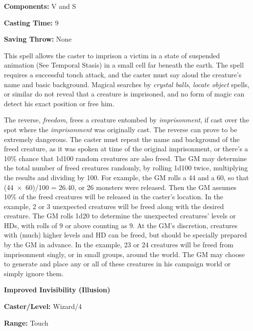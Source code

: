 \begin{multicols}{2}
\begin{minipage}{\columnwidth}
\noindent \textbf{Components:} V and S

\noindent \textbf{Casting Time:} 9

\noindent \textbf{Saving Throw:} None

\end{minipage}

This spell allows the caster to imprison a victim in a state of suspended animation (See Temporal Stasis) in a small cell far beneath the earth.  The spell requires a successful touch attack, and the caster must say aloud the creature's name and basic background.  Magical searches by \textit{crystal balls}, \textit{locate object} spells, or similar do not reveal that a creature is imprisoned, and no form of magic can detect his exact position or free him.

The reverse, \textit{freedom}, frees a creature entombed by \textit{imprisonment}, if cast over the spot where the \textit{imprisonment} was originally cast.  The reverse can prove to be extremely dangerous.  The caster must repeat the name and background of the freed creature, as it was spoken at time of the original imprisonment, or there's a 10\% chance that 1d100 random creatures are also freed.  The GM may determine the total number of freed creatures randomly, by rolling 1d100 twice, multiplying the results and dividing by 100.  For example, the GM rolls a 44 and a 60, so that (44~$\times$~60)/100 = 26.40, or 26 monsters were released.  Then the GM assumes 10\% of the freed creatures will be released in the caster's location.  In the example, 2 or 3 unexpected creatures will be freed along with the desired creature.  The GM rolls 1d20 to determine the unexpected creatures' levels or HDs, with rolls of 9 or above counting as 9.  At the GM's discretion, creatures with (much) higher levels and HD can be freed, but should be specially prepared by the GM in advance.  In the example, 23 or 24 creatures will be freed from imprisonment singly, or in small groups, around the world.  The GM may choose to generate and place any or all of these creatures in his campaign world or simply ignore them.

\vspace{1em}

\noindent
\begin{minipage}{\columnwidth}

\noindent \textbf{Improved Invisibility (Illusion)}

\noindent \textbf{Caster/Level:} Wizard/4

\noindent \textbf{Range:} Touch


\end{minipage}
\end{multicols}
